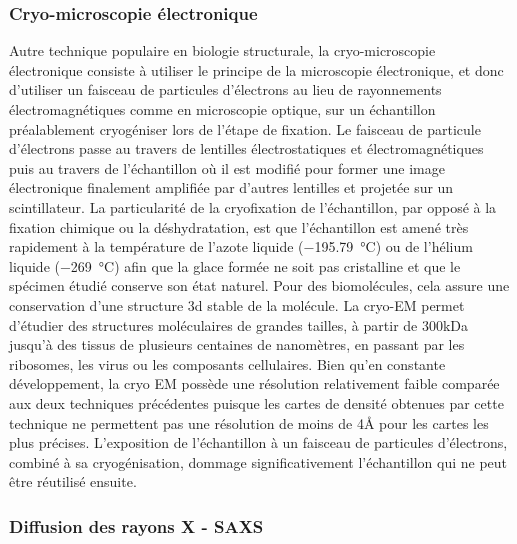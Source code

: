 \subsubsection{Cryo-microscopie électronique}

Autre technique populaire en biologie structurale, la cryo-microscopie électronique consiste à utiliser le principe de la microscopie électronique, et donc d'utiliser un faisceau de particules d'électrons au lieu de rayonnements électromagnétiques comme en microscopie optique, sur un échantillon préalablement cryogéniser lors de l'étape de fixation. Le faisceau de particule d'électrons passe au travers de lentilles électrostatiques et électromagnétiques puis au travers de l'échantillon où il est modifié pour former une image électronique finalement amplifiée par d'autres lentilles et projetée sur un scintillateur. 
La particularité de la cryofixation de l'échantillon, par opposé à la fixation chimique ou la déshydratation, est que l'échantillon est amené très rapidement à la température de l'azote liquide (\SI{-195.79}{\degreeCelsius}) ou de l'hélium liquide (\SI{-269}{\degreeCelsius}) afin que la glace formée ne soit pas cristalline et que le spécimen étudié conserve son état naturel. Pour des biomolécules, cela assure une conservation d'une structure 3d stable de la molécule. La cryo-EM permet d'étudier des structures moléculaires de grandes tailles, à partir de 300kDa jusqu'à des tissus de plusieurs centaines de nanomètres, en passant par les ribosomes, les virus ou les composants cellulaires.
Bien qu'en constante développement, la cryo EM possède une résolution relativement faible comparée aux deux techniques précédentes puisque les cartes de densité obtenues par cette technique ne permettent pas une résolution de moins de 4\r{A} pour les cartes les plus précises\cite{zhou_atomic_2011}. L'exposition de l'échantillon à un faisceau de particules d'électrons, combiné à sa cryogénisation, dommage significativement l'échantillon qui ne peut être réutilisé ensuite.

\subsubsection{Diffusion des rayons X - SAXS}

